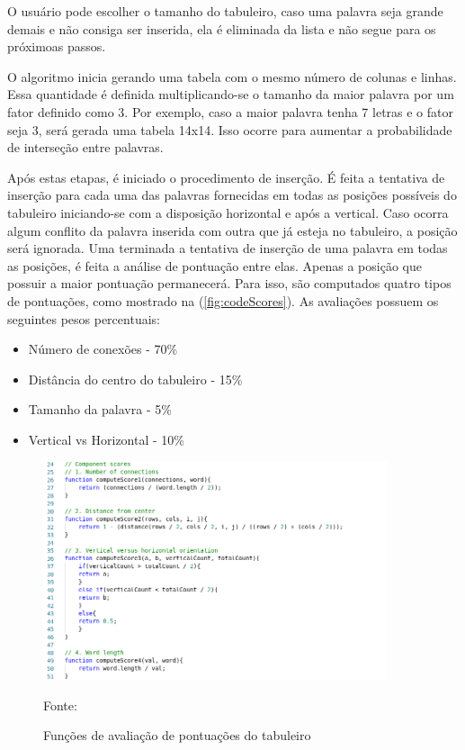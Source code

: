 O usuário pode escolher o tamanho do tabuleiro, caso uma palavra seja grande demais e não consiga ser inserida, ela é eliminada da lista e não segue para os próximoas passos.

O algoritmo inicia gerando uma tabela com o mesmo número de colunas e linhas. Essa quantidade é definida multiplicando-se o tamanho da maior palavra por um fator definido como 3. Por exemplo, caso a maior palavra tenha 7 letras e o fator seja 3, será gerada uma tabela 14x14. Isso ocorre para aumentar a probabilidade de interseção entre palavras. 

Após estas etapas, é iniciado o procedimento de inserção. É feita a tentativa de inserção para cada uma das palavras fornecidas em todas as posições possíveis do tabuleiro iniciando-se com a disposição horizontal e após a vertical. Caso ocorra algum conflito da palavra inserida com outra que já esteja no tabuleiro, a posição será ignorada. Uma terminada a tentativa de inserção de uma palavra em todas as posições, é feita a análise de pontuação entre elas. Apenas a posição que possuir a maior pontuação permanecerá. Para isso, são computados quatro tipos de pontuações, como mostrado na (\autoref{fig:codeScores}). As avaliações possuem os seguintes pesos percentuais:

\begin{itemize}
    \item Número de conexões - 70\%
    \item Distância do centro do tabuleiro - 15\%
    \item Tamanho da palavra - 5\%
    \item Vertical vs Horizontal - 10\%
\end{itemize}

\begin{figure}[H]
\centering
    \caption{Funções de avaliação de pontuações do tabuleiro}
    \label{fig:codeScores}
    \includegraphics[width=0.9\textwidth]{Figuras/codeComponentScores.png}
    
    Fonte: \cite{layoutGenerator}
\end{figure}


